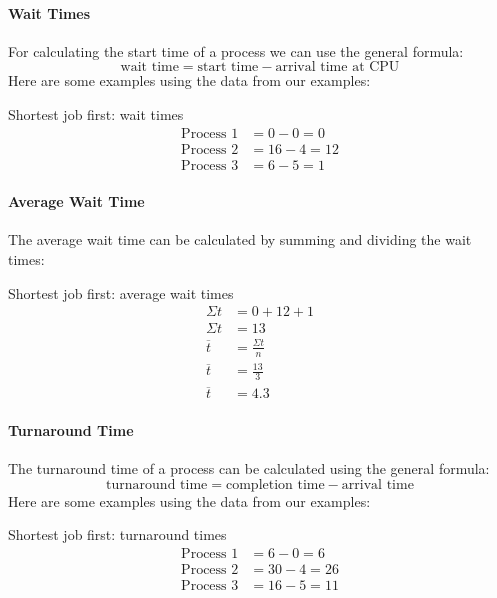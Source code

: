 \paragraph{Wait Times}\label{par:wait_times_1}

For calculating the start time of a process we can use the general formula:
\[
	\text{wait time} = \text{start time} - \text{arrival time at CPU}
\]
Here are some examples using the data from our examples:
\begin{highlight}{Shortest job first: wait times}
	\begin{align*}
		\text{Process \(1\)} & = 0 - 0 = 0   \\
		\text{Process \(2\)} & = 16 - 4 = 12 \\
		\text{Process \(3\)} & = 6 - 5 = 1
	\end{align*}
\end{highlight}

\paragraph{Average Wait Time}\label{par:average_wait_time_1}

The average wait time can be calculated by summing and dividing the wait times:
\begin{highlight}{Shortest job first: average wait times}
	\begin{align*}
		\Sigma t     & = 0 + 12 + 1         \\
		\Sigma t     & = 13                 \\
		\overline{t} & = \frac{\Sigma t}{n} \\
		\overline{t} & = \frac{13}{3}       \\
		\overline{t} & = 4.3
	\end{align*}
\end{highlight}

\paragraph{Turnaround Time}\label{par:turnaround_time_1}

The turnaround time of a process can be calculated using the general formula:
\[
	\text{turnaround time} = \text{completion time} - \text{arrival time}
\]
Here are some examples using the data from our examples:
\begin{highlight}{Shortest job first: turnaround times}
	\begin{align*}
		\text{Process \(1\)} & = 6 - 0 = 6   \\
		\text{Process \(2\)} & = 30 - 4 = 26 \\
		\text{Process \(3\)} & = 16 - 5 = 11
	\end{align*}
\end{highlight}

